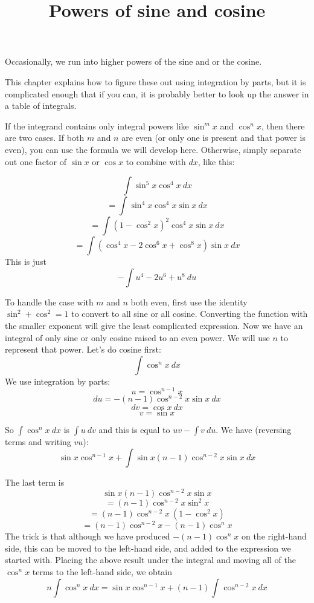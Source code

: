 \documentclass[11pt, oneside]{article}
\title{Powers of sine and cosine}
\date{}
\begin{document}
\maketitle
\Large


Occasionally, we run into higher powers of the sine and or the cosine.

This chapter explains how to figure these out using integration by parts, but it is complicated enough that if you can, it is probably better to look up the answer in a table of integrals.

If the integrand contains only integral powers like $\sin^m x$ and $\cos^n x$, then there are two cases.  If both $m$ and $n$ are even (or only one is present and that power is even), you can use the formula we will develop here.  Otherwise, simply separate out one factor of $\sin x$ or $\cos x$ to combine with $dx$, like this:

\[ \int \sin^5 x \cos^4 x \ dx \]
\[ = \int \sin^4 x \cos^4 x \sin x \ dx \]
\[ = \int (1- \cos^2 x)^2 \cos^4 x \sin x \ dx \]
\[ = \int (\cos^4 x - 2 \cos^6 x + \cos^8 x) \sin x \ dx \]
This is just
\[ -\int u^4 - 2u^6 + u^8 \ du \]

To handle the case with $m$ and $n$ both even, first use the identity $\sin^2 + \cos^2 = 1$ to convert to all sine or all cosine.  Converting the function with the smaller exponent will give the least complicated expression.  Now we have an integral of only sine or only cosine raised to an even power.  We will use $n$ to represent that power.  Let's do cosine first:
\[ \int \cos^n x \ dx \]
We use integration by parts:
\[ u = \cos^{n-1} x \]
\[ du = -(n-1)\cos^{n-2} x \sin x \ dx \]
\[ dv = \cos x \ dx \]
\[ v = \sin x \]

So $\int \cos^n x \ dx$ is $\int u \ dv$ and this is equal to $uv - \int v \ du$.  We have (reversing terms and writing $vu$):
\[ \sin x \cos^{n-1} x + \int \sin x (n-1) \cos^{n-2} x \sin x \ dx \]

The last term is
\[ \sin x (n-1) \cos^{n-2} x \sin x \]
\[ = (n-1) \cos^{n-2} x \sin^2 x  \]
\[ = (n-1) \cos^{n-2} x \ (1 - \cos^2 x)  \]
\[ = (n-1) \cos^{n-2} x - (n-1) \cos^n x \]
The trick is that although we have produced $- (n-1) \cos^n x$ on the right-hand side, this can be moved to the left-hand side, and added to the expression we started with.  Placing the above result under the integral and moving all of the $\cos^n x$ terms to the left-hand side, we obtain
\[ n \int \cos^n x \ dx =   \sin x \cos^{n-1} x +  (n-1) \int \cos^{n-2} x \ dx \]
\end{document}
